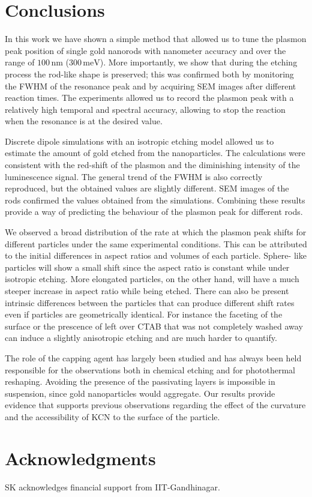 \documentclass[a4paper,oneside,onecolumn]{article}
\newcommand{\nm}{\ensuremath{\,\textrm{nm}}}
\newcommand{\meV}{\ensuremath{\,\textrm{meV}}}
\begin{document}
\section{Conclusions}
In this work we have shown a simple method that allowed us to tune the plasmon
peak position of single gold nanorods with nanometer accuracy and over the
range of $100\nm$ ($300\meV$). More importantly, we show that during the
etching process the rod-like shape is preserved; this was confirmed both by
monitoring the FWHM of the resonance peak and by acquiring SEM images after
different reaction times. The experiments allowed us to record the plasmon
peak with a relatively high temporal and spectral accuracy, allowing to
stop the reaction when the resonance is at the desired value.

Discrete dipole simulations with an isotropic etching model allowed us to estimate the amount of gold etched from the nanoparticles. The calculations were consistent with the red-shift of the plasmon and the diminishing intensity of the luminescence signal. The general trend of the FWHM is also correctly reproduced, but the obtained values are slightly different. SEM images of the rods confirmed the values obtained from the simulations. Combining these results provide a way of predicting the behaviour of the plasmon peak for different rods.

We observed a broad distribution of the rate at which the plasmon peak shifts
for different particles under the same experimental conditions. This can be
attributed to the initial differences in aspect ratios and volumes of each particle. Sphere-
like particles will show a small shift since the aspect ratio
is constant while under isotropic etching. More elongated particles, on
the other hand, will have a much steeper increase in aspect ratio while being
etched. There can also be present intrinsic differences between the particles that can produce different shift rates even if particles are geometrically identical. For instance the faceting of the surface or the prescence of left over CTAB that was not completely washed away can induce a slightly anisotropic etching and are much harder to quantify.

The role of the capping agent has largely been studied and has always been
held responsible for the observations both in chemical etching\cite{Yuan2015}
and for photothermal reshaping\cite{Horiguchi2008}. Avoiding the presence of
the passivating layers is impossible in suspension, since gold nanoparticles
would aggregate. Our results provide evidence that supports previous
observations regarding the effect of the curvature and the accessibility of
KCN to the surface of the particle.

\section{Acknowledgments}
SK acknowledges financial support from IIT-Gandhinagar.

{}

\end{document}
